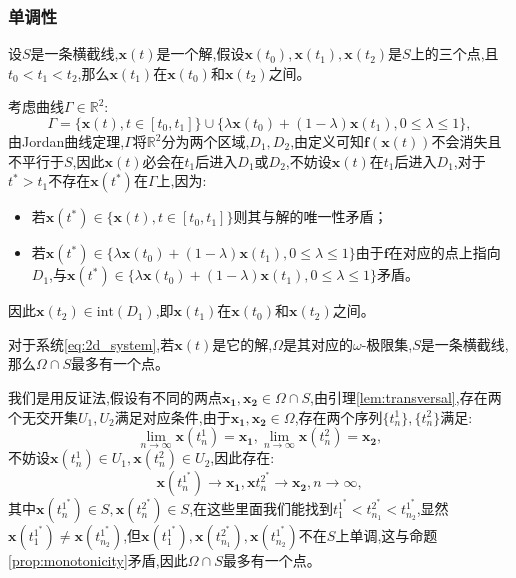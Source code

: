 \subsubsection{单调性}
\begin{prop}\label{prop:monotonicity}
    设$S$是一条横截线,$\mathbf{x}(t)$是一个解,假设$\mathbf{x}(t_0),\mathbf{x}(t_1),\mathbf{x}(t_2)$是$S$上的三个点,且$t_0<t_1<t_2$,那么$\mathbf{x}(t_1)$在$\mathbf{x}(t_0)$和$\mathbf{x}(t_2)$之间。
\end{prop}
\begin{pf}
    考虑曲线$\Gamma\in\mathbb{R}^2$:
    \begin{equation}
        \Gamma=\{\mathbf{x}(t),t\in[t_0,t_1]\}\cup\{\lambda\mathbf{x}(t_0)+(1-\lambda)\mathbf{x}(t_1),0\leq \lambda\leq 1\},
    \end{equation}
    由Jordan曲线定理,$\Gamma$将$\mathbb{R}^2$分为两个区域,$D_1,D_2$,由定义可知$\mathbf{f}(\mathbf{x}(t))$不会消失且不平行于$S$,因此$\mathbf{x}(t)$必会在$t_1$后进入$D_1$或$D_2$,不妨设$\mathbf{x}(t)$在$t_1$后进入$D_1$,对于$t^*>t_1$不存在$\mathbf{x}(t^*)$在$\Gamma$上,因为:
    \begin{itemize}
        \item 若$\mathbf{x}(t^*)\in \{\mathbf{x}(t),t\in[t_0,t_1]\}$则其与解的唯一性矛盾；
        \item 若$\mathbf{x}(t^*)\in \{\lambda\mathbf{x}(t_0)+(1-\lambda)\mathbf{x}(t_1),0\leq \lambda\leq 1\}$由于$\mathbf{f}$在对应的点上指向$D_1$,与$\mathbf{x}(t^*)\in \{\lambda\mathbf{x}(t_0)+(1-\lambda)\mathbf{x}(t_1),0\leq \lambda\leq 1\}$矛盾。
    \end{itemize}
    因此$\mathbf{x}(t_2)\in \text{int}(D_1)$,即$\mathbf{x}(t_1)$在$\mathbf{x}(t_0)$和$\mathbf{x}(t_2)$之间。
\end{pf}
\begin{prop}\label{prop:at_most_one_point}
    对于系统\ref{eq:2d_system},若$\mathbf{x}(t)$是它的解,$\Omega$是其对应的$\omega$-极限集,$S$是一条横截线,那么$\Omega\cap S$最多有一个点。
\end{prop}
\begin{pf}
    我们是用反证法,假设有不同的两点$\mathbf{x_1},\mathbf{x_2}\in\Omega\cap S$,由引理\ref{lem:transversal},存在两个无交开集$U_1,U_2$满足对应条件,由于$\mathbf{x_1},\mathbf{x_2}\in \Omega$,存在两个序列$\{t_n^1\},\{t_n^2\}$满足:
    \begin{equation}
        \lim_{n\to\infty}\mathbf{x}(t_n^1)=\mathbf{x_1},
        \lim_{n\to\infty}\mathbf{x}(t_n^2)=\mathbf{x_2},
    \end{equation}
    不妨设$\mathbf{x}(t_n^1)\in U_1,\mathbf{x}(t_n^2)\in U_2$,因此存在:
    \begin{equation}
        \mathbf{x}(t_n^{1^*})\to\mathbf{x_1}, \mathbf{x}{t_n^{{2^*}}}\to \mathbf{x_2},n\to\infty,
    \end{equation}
    其中$\mathbf{x}(t_n^{1^*})\in S,\mathbf{x}(t_n^{{2^*}})\in S$,在这些里面我们能找到$t_{1}^{1^*}<t_{n_1}^{{2^*}}<t_{n_2}^{1^*}$,显然$\mathbf{x}(t_1^{1^*})\neq \mathbf{x}(t_{n_2}^{1^*})$,但$\mathbf{x}(t_1^{1^*}),\mathbf{x}(t_{n_1}^{{2^*}}),\mathbf{x}(t_{n_2}^{1^*})$不在$S$上单调,这与命题\ref{prop:monotonicity}矛盾,因此$\Omega\cap S$最多有一个点。
\end{pf}
